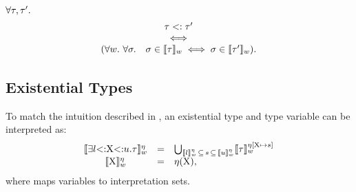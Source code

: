 \begin{theorem}[]
    $\forall \tau, \tau'.$
    \[
        \begin{array}{c}
            \tau <: \tau' \\
            \iff \\
            (\forall w.\ \forall \sigma.\quad \sigma \in \llbracket \tau \rrbracket_w \iff
                \sigma \in \llbracket \tau' \rrbracket_w).
        \end{array}
    \]
\end{theorem}

\subsection{Existential Types}

To match the intuition described in ,
an existential type and type variable can be interpreted as:
\[
\begin{array}{ccl}
    \llbracket \exists l{\operatorname{<:}}\mathrm{X}{\operatorname{<:}}u.\tau \rrbracket^{\eta}_w &=& 
        \bigcup_{\llbracket l \rrbracket^{\eta}_w\, \subseteq\, s\,
            \subseteq\, \llbracket u \rrbracket^{\eta}_w}
        \llbracket \tau \rrbracket^{\eta[\mathrm{X}\,\!\mapsto\!\,s]}_w \\
    \llbracket \mathrm{X} \rrbracket^{\eta}_w &=& \eta(\mathrm{X}), \\
\end{array}
\]
where %
\semsubstvars maps variables to interpretation sets.

